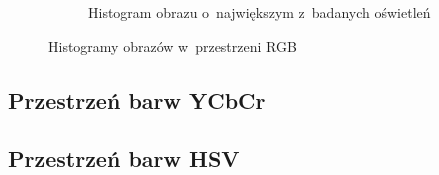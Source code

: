 \begin{figure}
\begin{subfigure}{0.9\textwidth}
		\caption{Histogram obrazu o~największym z~badanych oświetleń}
		\label{fig:rgb_hist3}
	\end{subfigure}
	\caption{Histogramy obrazów w~przestrzeni RGB}
	\label{fig:rgb_hist}
\end{figure}
\subsection{Przestrzeń barw YCbCr} 
\label{sec:ycbcr}

\subsection{Przestrzeń barw HSV} 
\label{sec:hsv}


